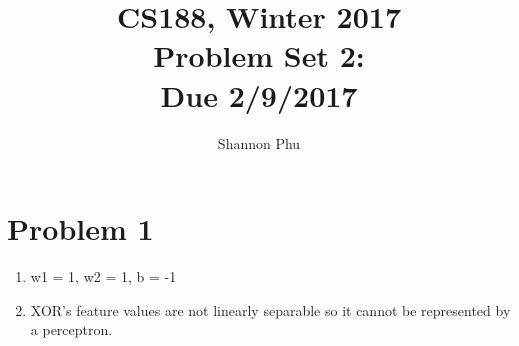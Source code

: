 \documentclass[11pt]{article}
\newcommand{\cnum}{CS188}
\newcommand{\ced}{Winter 2017}
\newcommand{\ctitle}[3]{\title{\vspace{-0.5in}\cnum, \ced\\Problem Set #1: #2\\Due #3}}
\begin{document}
\ctitle{2}{}{2/9/2017}
\author{Shannon Phu}
\date{}
\maketitle
\vspace{-0.3in}

\section{Problem 1}
    \begin{enumerate}
        \item
            w1 = 1,
            w2 = 1,
            b = -1
        \item 
            XOR's feature values are not linearly separable so it cannot be represented by a perceptron.
        
        \vfill
        \clearpage
    
    \end{enumerate}

\newpage
\end{document}
